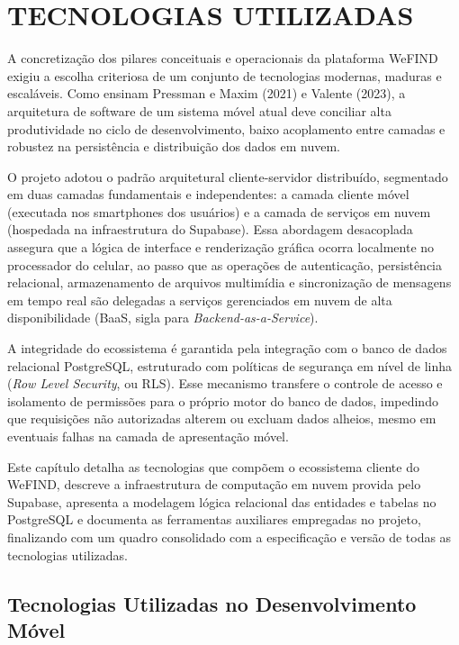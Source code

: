 \section{TECNOLOGIAS UTILIZADAS}

A concretização dos pilares conceituais e operacionais da plataforma WeFIND exigiu a escolha criteriosa de um conjunto de tecnologias modernas, maduras e escaláveis. Como ensinam Pressman e Maxim (2021) e Valente (2023), a arquitetura de software de um sistema móvel atual deve conciliar alta produtividade no ciclo de desenvolvimento, baixo acoplamento entre camadas e robustez na persistência e distribuição dos dados em nuvem.

O projeto adotou o padrão arquitetural cliente-servidor distribuído, segmentado em duas camadas fundamentais e independentes: a camada cliente móvel (executada nos smartphones dos usuários) e a camada de serviços em nuvem (hospedada na infraestrutura do Supabase). Essa abordagem desacoplada assegura que a lógica de interface e renderização gráfica ocorra localmente no processador do celular, ao passo que as operações de autenticação, persistência relacional, armazenamento de arquivos multimídia e sincronização de mensagens em tempo real são delegadas a serviços gerenciados em nuvem de alta disponibilidade (BaaS, sigla para \textit{Backend-as-a-Service}).

A integridade do ecossistema é garantida pela integração com o banco de dados relacional PostgreSQL, estruturado com políticas de segurança em nível de linha (\textit{Row Level Security}, ou RLS). Esse mecanismo transfere o controle de acesso e isolamento de permissões para o próprio motor do banco de dados, impedindo que requisições não autorizadas alterem ou excluam dados alheios, mesmo em eventuais falhas na camada de apresentação móvel.

Este capítulo detalha as tecnologias que compõem o ecossistema cliente do WeFIND, descreve a infraestrutura de computação em nuvem provida pelo Supabase, apresenta a modelagem lógica relacional das entidades e tabelas no PostgreSQL e documenta as ferramentas auxiliares empregadas no projeto, finalizando com um quadro consolidado com a especificação e versão de todas as tecnologias utilizadas.

\clearpage

\subsection{Tecnologias Utilizadas no Desenvolvimento Móvel}


